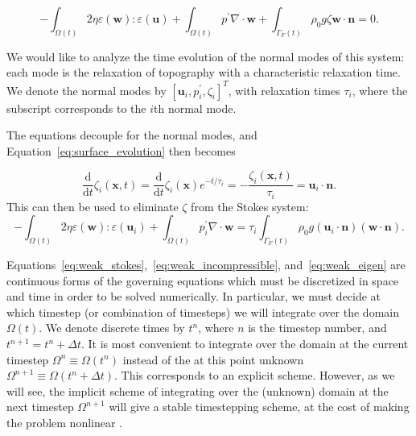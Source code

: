 \documentclass[preprint,12pt,authoryear]{elsarticle}
\begin{document}
\begin{equation}
-\int_{\Omega(t)} 2 \eta \varepsilon( \mathbf{w} ) \colon \varepsilon( \mathbf{u} ) + \int_{\Omega(t)} p^\prime \nabla \cdot \mathbf{w} 
+ \int_{\Gamma_F(t)} \rho_0 g \zeta  \mathbf{w} \cdot \mathbf{n} = 0.
\end{equation}

We would like to analyze the time evolution of the normal modes of this system: each mode 
is the relaxation of topography with a characteristic relaxation time.  
We denote the normal modes by $\left[ \mathbf{u}_i, p^\prime_i, \zeta_i \right]^T$, with
relaxation times $\tau_i$, where the subscript corresponds to the $i$th normal mode.

The equations decouple for the normal modes, and Equation~\eqref{eq:surface_evolution} then becomes

\begin{equation}
\frac {\text{d}}{\text{d} t} \zeta_i(\mathbf{x},t) = \frac{\text{d}}{\text{d}t} \zeta_i(\mathbf{x})e^{-t/\tau_i} = -\frac{\zeta_i(\mathbf{x},t)}{\tau_i} = \mathbf{u}_i \cdot \mathbf{n}.
\end{equation}
This can then be used to eliminate $\zeta$ from the Stokes system:
\begin{equation}
-\int_{\Omega(t)} 2 \eta \varepsilon( \mathbf{w} ) \colon \varepsilon( \mathbf{u}_i ) + \int_{\Omega(t)} p^\prime_i \nabla \cdot \mathbf{w} 
= \tau_i \int_{\Gamma_F(t)} \rho_0 g (\mathbf{u}_i \cdot \mathbf{n} ) (\mathbf{w} \cdot \mathbf{n}).
\label{eq:weak_eigen}
\end{equation}

Equations~\eqref{eq:weak_stokes},~\eqref{eq:weak_incompressible}, and~\eqref{eq:weak_eigen}
are continuous forms of the governing equations which must be discretized in space and time in order to be solved numerically.
In particular, we must decide at which timestep (or combination of timesteps) we will integrate over the domain $\Omega(t)$.
We denote discrete times by $t^n$, where $n$ is the timestep number, and $t^{n+1} = t^n+\Delta t$.
It is most convenient to integrate over the domain at the current timestep $\Omega^n \equiv \Omega(t^n)$ instead of 
the at this point unknown $\Omega^{n+1} \equiv \Omega(t^{n}+\Delta t)$. This corresponds to an explicit scheme.
However, as we will see, the implicit scheme of integrating over the (unknown) domain at the next timestep $\Omega^{n+1}$ will
give a stable timestepping scheme, at the cost of making the problem nonlinear \citep{furuichi2015implicit}.
\end{document}
